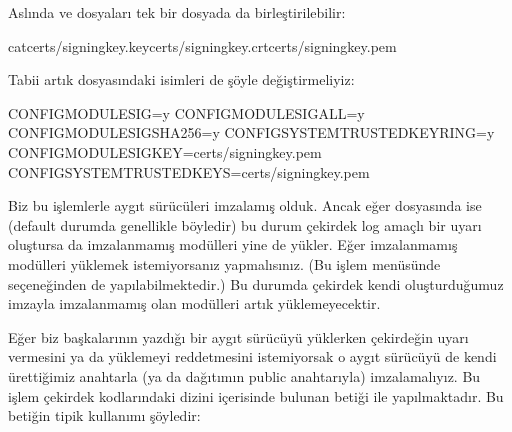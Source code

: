 \documentclass[a4paper,10pt,turkish]{sphinxmanual}
\begin{document}
\sphinxAtStartPar
Aslında  ve  dosyaları tek bir dosyada da birleştirilebilir:

\begin{sphinxVerbatim}[commandchars=\\\{\}]
\PYGZdl{}catcerts/signing\PYGZus{}key.keycerts/signing\PYGZus{}key.crt\PYGZgt{}certs/signing\PYGZus{}key.pem
\end{sphinxVerbatim}

\sphinxAtStartPar
Tabii artık  dosyasındaki isimleri de şöyle değiştirmeliyiz:

\begin{sphinxVerbatim}[commandchars=\\\{\}]
CONFIG\PYGZus{}MODULE\PYGZus{}SIG=y
CONFIG\PYGZus{}MODULE\PYGZus{}SIG\PYGZus{}ALL=y
CONFIG\PYGZus{}MODULE\PYGZus{}SIG\PYGZus{}SHA256=y
CONFIG\PYGZus{}SYSTEM\PYGZus{}TRUSTED\PYGZus{}KEYRING=y
CONFIG\PYGZus{}MODULE\PYGZus{}SIG\PYGZus{}KEY=\PYGZdq{}certs/signing\PYGZus{}key.pem\PYGZdq{}
CONFIG\PYGZus{}SYSTEM\PYGZus{}TRUSTED\PYGZus{}KEYS=\PYGZdq{}certs/signing\PYGZus{}key.pem\PYGZdq{}
\end{sphinxVerbatim}

\sphinxAtStartPar
Biz bu işlemlerle aygıt sürücüleri imzalamış olduk. Ancak eğer  dosyasında
 ise (default durumda genellikle böyledir) bu durum çekirdek log amaçlı
bir uyarı oluştursa da imzalanmamış modülleri yine de yükler. Eğer imzalanmamış modülleri yüklemek
istemiyorsanız  yapmalısınız. (Bu işlem  menüsünde
seçeneğinden de yapılabilmektedir.) Bu durumda çekirdek kendi oluşturduğumuz imzayla imzalanmamış olan
modülleri artık yüklemeyecektir.

\sphinxAtStartPar
Eğer biz başkalarının yazdığı bir aygıt sürücüyü yüklerken çekirdeğin uyarı vermesini ya da yüklemeyi
reddetmesini istemiyorsak o aygıt sürücüyü de kendi ürettiğimiz anahtarla (ya da dağıtımın public
anahtarıyla) imzalamalıyız. Bu işlem çekirdek kodlarındaki  dizini içerisinde bulunan
 betiği ile yapılmaktadır. Bu betiğin tipik kullanımı şöyledir:
\end{document}
